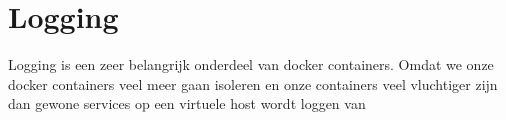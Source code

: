 \chapter{Logging}

Logging is een zeer belangrijk onderdeel van docker containers. Omdat we onze docker containers veel meer gaan isoleren en onze containers veel vluchtiger zijn dan gewone services op een virtuele host wordt loggen van